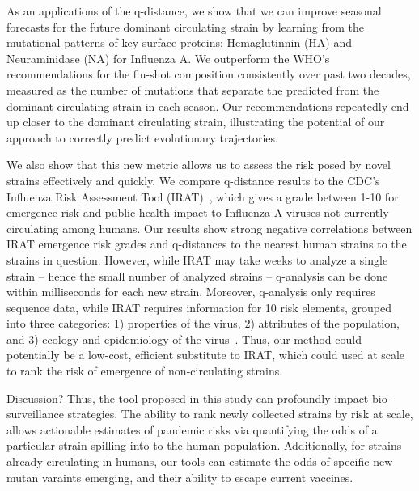\documentclass[onecolumn, compsoc,10pt]{IEEEtran}
\begin{document}
As an applications of the q-distance, we show that we can improve seasonal forecasts for the future dominant circulating strain by learning from the mutational patterns of key surface proteins: Hemaglutinnin (HA) and Neuraminidase (NA) for Influenza A. We outperform the WHO's recommendations for the flu-shot composition consistently over past two decades, measured as the number of mutations that separate the predicted from the dominant circulating strain in each season. Our recommendations repeatedly end up closer to the dominant circulating strain, illustrating the potential of our approach to correctly predict evolutionary trajectories. 

We also show that this new metric allows us to  assess the risk posed by novel strains  effectively and quickly. We compare q-distance results to the CDC's Influenza Risk Assessment Tool (IRAT)~\cite{Influenz24:online}, which gives a grade between 1-10 for emergence risk and public health impact to Influenza A viruses not currently circulating among humans. Our results show strong negative correlations between IRAT emergence risk grades and q-distances to the nearest human strains to the strains in question. However, while IRAT may take weeks to analyze a single strain -- hence the small number of analyzed strains -- q-analysis can be done within milliseconds for each new strain. Moreover, q-analysis only requires sequence data, while IRAT requires information for 10 risk elements, grouped into three categories: 1) properties of the virus, 2) attributes of the population, and 3) ecology and epidemiology of the virus~\cite{Influenz24:online}. Thus, our method could potentially be a low-cost, efficient substitute to IRAT, which could used at scale to rank the risk of emergence of non-circulating strains.

{\color{Red1} Discussion? 
  Thus, the tool proposed in this study  can  profoundly impact  bio-surveillance strategies. The ability to rank newly collected strains by risk at scale, allows actionable estimates of  pandemic risks via  quantifying the odds of a particular strain spilling into to the human population. Additionally,  for strains already circulating in humans, our tools can estimate the odds  of specific  new mutan varaints emerging, and their ability to  escape current vaccines. %
}
\end{document}
